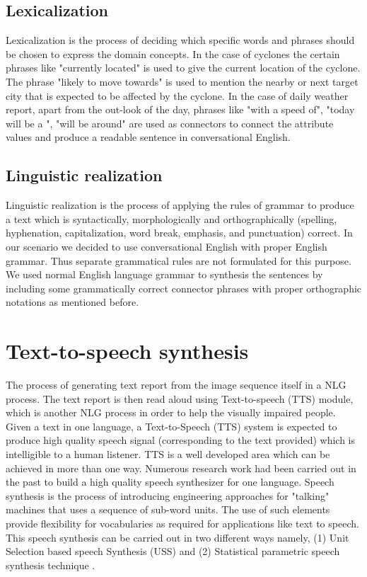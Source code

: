 \documentclass{article}
\begin{document}
\subsection{Lexicalization}
\label{ssec:lexi}

Lexicalization is the process of deciding which specific words and phrases should be chosen to express the domain concepts. In the case of cyclones the certain  phrases like "currently located" is used to give the current location of the cyclone. The phrase "likely to move towards" is used to mention the nearby or next target city that is expected to be affected by the cyclone. In the case of daily weather report, apart from the out-look of the day, phrases like "with a speed of", "today will be a ", "will be around" are used as connectors to connect the attribute values and produce a readable sentence in conversational English. 


\subsection{Linguistic realization}
\label{ssec:linguisticRealization}
Linguistic realization is the process of applying the rules of grammar to produce a text which is syntactically, morphologically and orthographically (spelling, hyphenation, capitalization, word break, emphasis, and punctuation) correct. In our scenario we decided to use conversational English with proper English grammar. Thus separate grammatical rules are not formulated for this purpose. We used normal English language grammar to synthesis the sentences by including some grammatically correct connector phrases with proper orthographic notations as mentioned before.

\section{Text-to-speech synthesis}
\label{sec:tts}
The process of generating text report from the image sequence itself in a NLG process. 
The text report is then read aloud using Text-to-speech (TTS) module, which is another 
NLG process in order to help the visually impaired people. Given a text in one language, 
a Text-to-Speech (TTS) system is expected to produce high quality speech signal
(corresponding to the text provided) which is intelligible to a human listener. TTS
is a well developed area which can be achieved in more than one way. Numerous research 
work had been carried out in the past to build a high quality speech synthesizer 
for one language. Speech synthesis is the process of introducing engineering approaches 
for "talking" machines that uses a sequence of sub-word units. The use of such elements
provide flexibility for vocabularies as required for applications like text to speech. This speech synthesis can be carried out in two different ways namely, (1) Unit Selection based speech Synthesis (USS) \cite{uss} and (2) Statistical parametric speech synthesis technique \cite{zenStatistical}.
\end{document}
